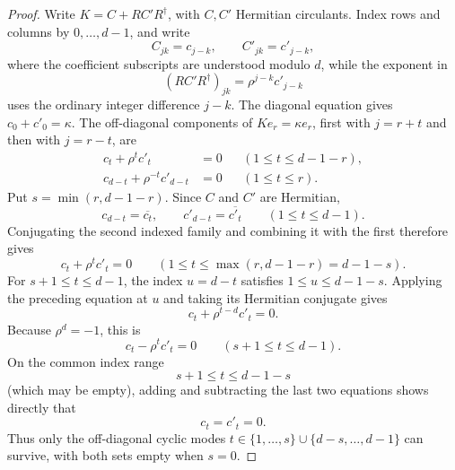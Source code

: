 \documentclass[11pt]{article}
\theoremstyle{definition}
\theoremstyle{remark}
\begin{document}
\begin{proof}
Write \(K=C+RC'R^\dagger\), with \(C,C'\) Hermitian circulants.  Index rows
and columns by \(0,\ldots,d-1\), and write
\[
 C_{jk}=c_{j-k},
 \qquad
 C'_{jk}=c'_{j-k},
\]
where the coefficient subscripts are understood modulo \(d\), while the
exponent in
\[
 (RC'R^\dagger)_{jk}=\rho^{j-k}c'_{j-k}
\]
uses the ordinary integer difference \(j-k\).  The diagonal equation gives
\(c_0+c'_0=\kappa\).  The off-diagonal components of
\(Ke_r=\kappa e_r\), first with \(j=r+t\) and then with \(j=r-t\), are
\begin{align*}
 c_t+\rho^t c'_t&=0
 &&(1\leq t\leq d-1-r),\\
 c_{d-t}+\rho^{-t}c'_{d-t}&=0
 &&(1\leq t\leq r).
\end{align*}
Put \(s=\min(r,d-1-r)\).  Since \(C\) and \(C'\) are Hermitian,
\[
 c_{d-t}=\overline{c_t},
 \qquad
 c'_{d-t}=\overline{c'_t}
 \qquad(1\leq t\leq d-1).
\]
Conjugating the second indexed family and combining it with the first
therefore gives
\[
 c_t+\rho^t c'_t=0
 \qquad(1\leq t\leq\max(r,d-1-r)=d-1-s).
\]
For \(s+1\leq t\leq d-1\), the index \(u=d-t\) satisfies
\(1\leq u\leq d-1-s\).  Applying the preceding equation at \(u\) and
taking its Hermitian conjugate gives
\[
 c_t+\rho^{t-d}c'_t=0.
\]
Because \(\rho^d=-1\), this is
\[
 c_t-\rho^t c'_t=0
 \qquad(s+1\leq t\leq d-1).
\]
On the common index range
\[
 s+1\leq t\leq d-1-s
\]
(which may be empty), adding and subtracting the last two equations shows
directly that
\[
 c_t=c'_t=0.
\]
Thus only the off-diagonal cyclic modes
\(t\in\{1,\ldots,s\}\cup\{d-s,\ldots,d-1\}\) can survive, with both
sets empty when \(s=0\).


\end{proof}
\end{document}
